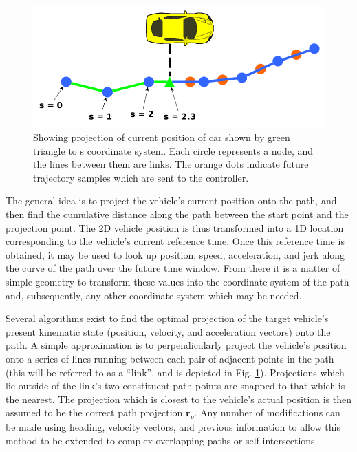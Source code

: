 \documentclass[letterpaper, 10 pt, conference]{ieeeconf}  %
\begin{document}
\begin{figure}[thpb]
  \centering
  \includegraphics[width=0.8\columnwidth]{graphics/PathProjectionSlice.png}
  \caption{Showing projection of current position of car shown by green triangle to s coordinate system. Each circle represents a node, and the lines between them are links. The orange dots indicate future trajectory samples which are sent to the controller.
  }

  \label{fig:cartos}
\end{figure}

The general idea is to project the vehicle's current position onto the path, and then find the cumulative distance along the path between the start point and the projection point.
The 2D vehicle position is thus transformed into a 1D location corresponding to the vehicle's current reference time.
Once this reference time is obtained, it may be used to look up position, speed, acceleration, and jerk along the curve of the path over the future time window.
From there it is a matter of simple geometry to transform these values into the coordinate system of the path and, subsequently, any other coordinate system which may be needed.


Several algorithms exist to find the optimal projection of the target vehicle's present kinematic state (position, velocity, and acceleration vectors) onto the path.
A simple approximation is to perpendicularly project the vehicle's position onto a series of lines running between each pair of adjacent points in the path (this will be referred to as a ``link'', and is depicted in Fig. \ref{fig:cartos}).
Projections which lie outside of the link's two constituent path points are snapped to that which is the nearest.
The projection which is closest to the vehicle's actual position is then assumed to be the correct path projection $\mathbf{r}_p$.
Any number of modifications can be made using heading, velocity vectors, and previous information to allow this method to be extended to complex overlapping paths or self-intersections.
\end{document}
